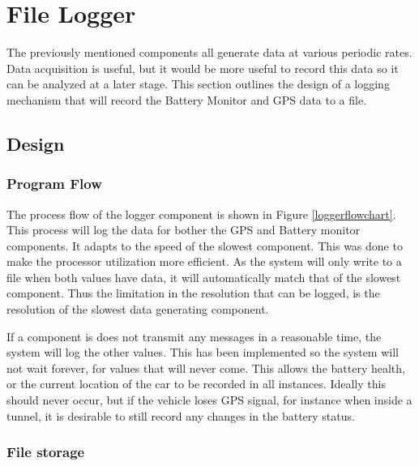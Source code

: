 

\section{File Logger}
\label{sec:filelogger}

The previously mentioned components all generate data at various periodic rates. Data acquisition is useful, but it would be more useful to record this data so it can be analyzed at a later stage. This section outlines the design of a logging mechanism that will record the Battery Monitor and GPS data to a file. 

\subsection {Design}

\subsubsection{Program Flow}
The process flow of the logger component is shown in Figure \ref{loggerflowchart}. This process will log the data for bother the GPS and Battery monitor components. It adapts to the speed of the slowest component. This was done to make the processor utilization more efficient. As the system will only write to a file when both values have data, it will automatically match that of the slowest component. Thus the limitation in the resolution that can be logged, is the resolution of the slowest data generating component.


If a component is does not transmit any messages in a reasonable time, the system will log the other values. This has been implemented so the system will not wait forever, for values that will never come. This allows the battery health, or the current location of the car to be recorded in all instances. Ideally this should never occur, but if the vehicle loses GPS signal, for instance when inside a tunnel, it is desirable to still record any changes in the battery status.

\subsubsection{File storage}

